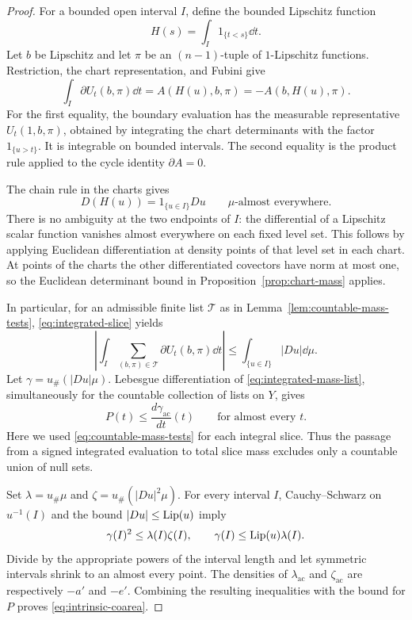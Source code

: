 \begin{proof}
For a bounded open interval $I$, define the bounded Lipschitz function
\[
 H(s)=\int_I1_{\{t<s\}}\dd t.
\]
Let $b$ be Lipschitz and let $\pi$ be an $(n-1)$-tuple of
$1$-Lipschitz functions.  Restriction, the chart representation, and
Fubini give
\begin{equation}
 \int_I\partial U_t(b,\pi)\dd t
   =A(H(u),b,\pi)=-A(b,H(u),\pi).
 \label{eq:integrated-slice}
\end{equation}
For the first equality, the boundary evaluation has the measurable
representative $U_t(1,b,\pi)$, obtained by integrating the chart
determinants with the factor $1_{\{u>t\}}$.  It is integrable on bounded
intervals.  The second equality is the product rule applied to the
cycle identity $\partial A=0$.

The chain rule in the charts gives
\[
 D(H(u))=1_{\{u\in I\}}Du\qquad\mu\text{-almost everywhere}.
\]
There is no ambiguity at the two endpoints of $I$: the differential
of a Lipschitz scalar function vanishes almost everywhere on each
fixed level set.  This follows by applying Euclidean differentiation
at density points of that level set in each chart.  At points of the
charts the other differentiated covectors have norm at most one, so
the Euclidean determinant bound in
Proposition~\ref{prop:chart-mass} applies.

In particular, for an admissible finite list $\mathcal T$ as in
Lemma~\ref{lem:countable-mass-tests}, \eqref{eq:integrated-slice} yields
\begin{equation}
 \left|\int_I\sum_{(b,\pi)\in\mathcal T}
                  \partial U_t(b,\pi)\dd t\right|
 \le\int_{\{u\in I\}}|Du|\dd\mu.
 \label{eq:integrated-mass-list}
\end{equation}
Let $\gamma=u_\#(|Du|\mu)$.  Lebesgue differentiation of
\eqref{eq:integrated-mass-list}, simultaneously for the countable
collection of lists on $Y$, gives
\[
 P(t)\le\frac{d\gamma_{\mathrm{ac}}}{dt}(t)
 \qquad\text{for almost every }t.
\]
Here we used \eqref{eq:countable-mass-tests} for each integral slice.
Thus the passage from a signed integrated evaluation to total slice
mass excludes only a countable union of null sets.

Set $\lambda=u_\#\mu$ and $\zeta=u_\#(|Du|^2\mu)$.  For every interval
$I$, Cauchy--Schwarz on $u^{-1}(I)$ and the bound
$|Du|\le\operatorname{Lip}(u)$ imply
\[
 \gamma(I)^2\le\lambda(I)\zeta(I),\qquad
 \gamma(I)\le\operatorname{Lip}(u)\lambda(I).
\]
Divide by the appropriate powers of the interval length and let
symmetric intervals shrink to an almost every point.  The densities
of $\lambda_{\mathrm{ac}}$ and $\zeta_{\mathrm{ac}}$ are respectively
$-a'$ and $-e'$.  Combining the resulting inequalities with the bound
for $P$ proves \eqref{eq:intrinsic-coarea}.
\end{proof}

